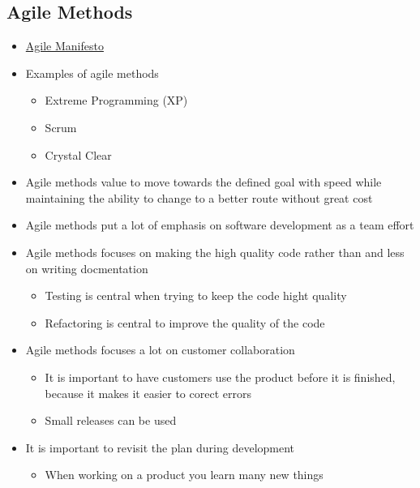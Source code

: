 \documentclass[11pt]{article}
\providecommand{\tightlist}{%
      \setlength{\itemsep}{0pt}\setlength{\parskip}{0pt}}
\begin{document}
\hypertarget{agile-methods}{%
\subsection{Agile Methods}\label{agile-methods}}

\begin{itemize}
\tightlist
\item
  \href{http://agilemanifesto.org/}{Agile Manifesto}
\item
  Examples of agile methods

  \begin{itemize}
  \tightlist
  \item
    Extreme Programming (XP)
  \item
    Scrum
  \item
    Crystal Clear
  \end{itemize}
\item
  Agile methods value to move towards the defined goal with speed while
  maintaining the ability to change to a better route without great cost
\item
  Agile methods put a lot of emphasis on software development as a team
  effort
\item
  Agile methods focuses on making the high quality code rather than and
  less on writing docmentation

  \begin{itemize}
  \tightlist
  \item
    Testing is central when trying to keep the code hight quality
  \item
    Refactoring is central to improve the quality of the code
  \end{itemize}
\item
  Agile methods focuses a lot on customer collaboration

  \begin{itemize}
  \tightlist
  \item
    It is important to have customers use the product before it is
    finished, because it makes it easier to corect errors
  \item
    Small releases can be used
  \end{itemize}
\item
  It is important to revisit the plan during development

  \begin{itemize}
  \tightlist
  \item
    When working on a product you learn many new things
  \end{itemize}
\end{itemize}
\end{document}
